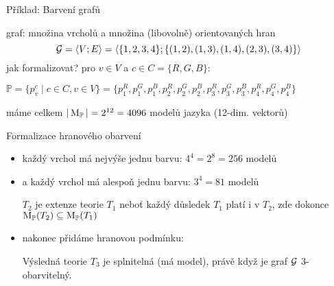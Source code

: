 \documentclass{beamer}
\begin{document}
\begin{frame}{Příklad: Barvení grafů}


    
    graf: množina vrcholů a množina (libovolně) \alert{orientovaných} hran
    \[
    \mathcal{G} = \langle V; E \rangle = \langle \{1,2,3,4\}; \{(1,2),(1,3),(1,4),(2,3),(3,4)\} \rangle
    \]
    jak formalizovat? pro $v\in V$ a $c\in C=\{R,G,B\}$:

    \vspace{-12pt}

    \mbox{\small $\mathbb P=\{p_v^c\mid c\in C,v\in V\}=\{p_1^R,p_1^G,p_1^B,p_2^R,p_2^G,p_2^B,p_3^R,p_3^G,p_3^B,p_4^R,p_4^G,p_4^B\}$}

máme celkem \( |\operatorname{M}_\mathbb P|=2^{12}=4096 \) \alert{modelů jazyka} (12-dim. vektorů)
\end{frame}


\begin{frame}{Formalizace hranového obarvení}
\begin{itemize}
    \item každý vrchol má nejvýše jednu barvu: $4^4=2^8=256$ modelů

    \item a každý vrchol má alespoň jednu barvu: $3^4=81$ modelů
    
    $T_2$ je \alert{extenze} teorie $T_1$ neboť \alert{každý důsledek $T_1$ platí i v $T_2$}, zde dokonce $\operatorname{M}_\mathbb P(T_2)\subseteq\operatorname{M}_\mathbb P(T_1)$

    \item nakonec přidáme \alert{hranovou podmínku}:
     
    Výsledná teorie \( T_3 \) je \alert{splnitelná} (má model), právě když je graf \( \mathcal{G} \) 3-obarvitelný.   
\end{itemize}
\end{frame}
\end{document}
